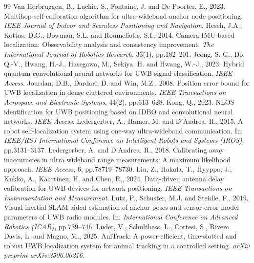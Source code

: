 \documentclass[10pt,a4paper]{article}
\begin{document}
\begin{thebibliography}{99}
 Van Herbruggen, B., Luchie, S., Fontaine, J. and De Poorter, E., 2023. Multihop self-calibration algorithm for ultra-wideband anchor node positioning. \emph{IEEE Journal of Indoor and Seamless Positioning and Navigation}.
 Hesch, J.A., Kottas, D.G., Bowman, S.L. and Roumeliotis, S.I., 2014. Camera-IMU-based localization: Observability analysis and consistency improvement. \emph{The International Journal of Robotics Research}, 33(1), pp.182--201.
 Jeong, S.-G., Do, Q.-V., Hwang, H.-J., Hasegawa, M., Sekiya, H. and Hwang, W.-J., 2023. Hybrid quantum convolutional neural networks for UWB signal classification. \emph{IEEE Access}.
 Jourdan, D.B., Dardari, D. and Win, M.Z., 2008. Position error bound for UWB localization in dense cluttered environments. \emph{IEEE Transactions on Aerospace and Electronic Systems}, 44(2), pp.613--628.
 Kong, Q., 2023. NLOS identification for UWB positioning based on IDBO and convolutional neural networks. \emph{IEEE Access}.
 Ledergerber, A., Hamer, M. and D'Andrea, R., 2015. A robot self-localization system using one-way ultra-wideband communication. In: \emph{IEEE/RSJ International Conference on Intelligent Robots and Systems (IROS)}, pp.3131--3137.
 Ledergerber, A. and D'Andrea, R., 2018. Calibrating away inaccuracies in ultra wideband range measurements: A maximum likelihood approach. \emph{IEEE Access}, 6, pp.78719--78730.
 Liu, Z., Hakala, T., Hyyppa, J., Kukko, A., Kaartinen, H. and Chen, R., 2024. Data-driven antenna delay calibration for UWB devices for network positioning. \emph{IEEE Transactions on Instrumentation and Measurement}.
 Lutz, P., Schuster, M.J. and Steidle, F., 2019. Visual-inertial SLAM aided estimation of anchor poses and sensor error model parameters of UWB radio modules. In: \emph{International Conference on Advanced Robotics (ICAR)}, pp.739--746.
 Luder, V., Schulthess, L., Cortesi, S., Rivero Davis, L. and Magno, M., 2025. AniTrack: A power-efficient, time-slotted and robust UWB localization system for animal tracking in a controlled setting. \emph{arXiv preprint arXiv:2506.00216}.

\end{thebibliography}
\end{document}
